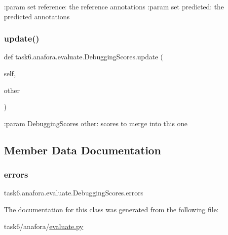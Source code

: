 \begin{DoxyVerb}:param set reference: the reference annotations
:param set predicted: the predicted annotations
\end{DoxyVerb}
 \mbox{\label{classtask6_1_1anafora_1_1evaluate_1_1DebuggingScores_aca1f0eda0796e2ac6fe857a512423ad7}} 
\subsubsection{\texorpdfstring{update()}{update()}}
{\footnotesize\ttfamily def task6.\+anafora.\+evaluate.\+Debugging\+Scores.\+update (\begin{DoxyParamCaption}\item[{}]{self,  }\item[{}]{other }\end{DoxyParamCaption})}

\begin{DoxyVerb}:param DebuggingScores other: scores to merge into this one
\end{DoxyVerb}
 

\subsection{Member Data Documentation}
\mbox{\label{classtask6_1_1anafora_1_1evaluate_1_1DebuggingScores_a53e5dfd1a1b463defaa94672fbb77efb}} 
\subsubsection{\texorpdfstring{errors}{errors}}
{\footnotesize\ttfamily task6.\+anafora.\+evaluate.\+Debugging\+Scores.\+errors}



The documentation for this class was generated from the following file\+:\begin{DoxyCompactItemize}
\item 
task6/anafora/\hyperlink{evaluate_8py}{evaluate.\+py}\end{DoxyCompactItemize}
